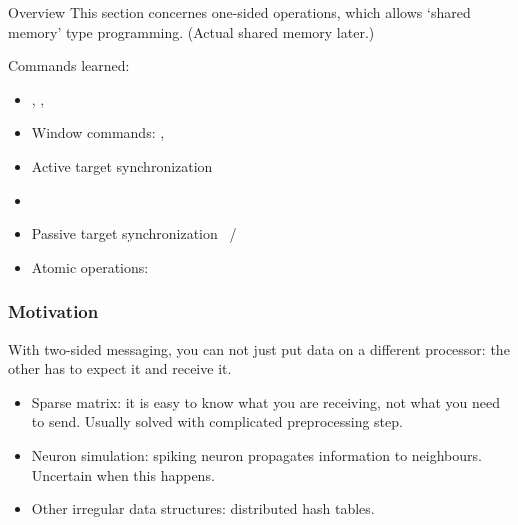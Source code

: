 
\begin{frame}[containsverbatim]{Overview}
  This section concernes one-sided operations, which allows `shared
  memory' type programming. (Actual shared memory later.)

  Commands learned:
  \begin{itemize}
  \item {}, , 
  \item Window commands: , 
  \item Active target synchronization 
  \item {}
  \item Passive target synchronization ~/
  \item Atomic operations: 
  \end{itemize}
\end{frame}


\begin{frame}[containsverbatim]\frametitle{Motivation}
  With two-sided messaging, you can not just put data
  on a different processor: the other has to expect it and receive it.

  \begin{itemize}
  \item Sparse matrix: it is easy to know what you are receiving, not what you need to send.
    Usually solved with complicated preprocessing step.
  \item Neuron simulation: spiking neuron propagates information to neighbours.
    Uncertain when this happens.
  \item Other irregular data structures: distributed hash tables.
  \end{itemize}
\end{frame}

